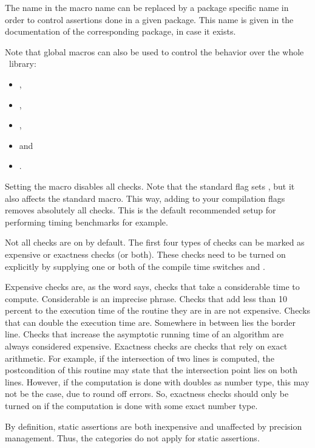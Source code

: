 The name  in the macro name can be replaced by a package
specific name in order to control assertions done in a given package.
This name is given in the documentation of the corresponding package,
in case it exists.

Note that global macros can also be used to control the behavior over the
whole \cgal\ library:
\begin{itemize}
  \item {},
  \item {},
  \item {},
  \item {} and
  \item {}.
\end{itemize}

Setting the macro  disables all checks.
Note that the standard flag  sets , but it also
affects the standard  macro.
This way, adding  to your compilation flags removes
absolutely all checks.  This is the default recommended setup for performing
timing benchmarks for example.

Not all checks are on by default.
The first four types of checks can be marked as expensive or exactness checks
(or both).
These checks need to be turned on explicitly by supplying one or both of
the compile time switches  and 
.

Expensive checks are, as the word says, checks that take a considerable
time to compute. 
Considerable is an imprecise phrase. 
Checks that add less than 10 percent to the execution time of the routine 
they are in are not expensive.
Checks that can double the execution time are. 
Somewhere in between lies the border line.
Checks that increase the asymptotic running time of an algorithm are always 
considered expensive.
Exactness checks are checks that rely on exact arithmetic. 
For example, if the intersection of two lines is computed, the postcondition 
of this routine may state that the intersection point lies on both lines. 
However, if the computation is done with doubles as number type, this may not 
be the case, due to round off errors. 
So, exactness checks should only be turned on if the computation is done 
with some exact number type.

By definition, static assertions are both inexpensive and unaffected by precision
management. Thus, the categories do not apply for static assertions.

